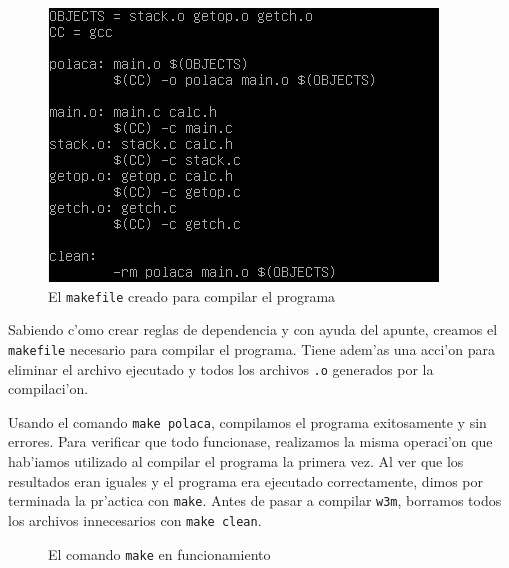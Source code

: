 \documentclass[11pt]{article}
\begin{document}
		\begin{figure}[H]
			\centering
			\includegraphics[width=.9\linewidth]{Images/Seccion 2/S2 parte tres.PNG}
			\caption{El \texttt{makefile} creado para compilar el programa}
			\label{fig:makefile}
		\end{figure}
		
		Sabiendo c'omo crear reglas de dependencia y con ayuda del apunte, creamos el \texttt{makefile} necesario para compilar el programa. Tiene adem'as una acci'on para eliminar el archivo ejecutado y todos los archivos \texttt{.o} generados por la compilaci'on.
		
		Usando el comando \texttt{make polaca}, compilamos el programa exitosamente y sin errores. Para verificar que todo funcionase, realizamos la misma operaci'on que hab'iamos utilizado al compilar el programa la primera vez. Al ver que los resultados eran iguales y el programa era ejecutado correctamente, dimos por terminada la pr'actica con \texttt{make}. Antes de pasar a compilar \texttt{w3m}, borramos todos los archivos innecesarios con \texttt{make clean}.
		
		\begin{figure}[H]
			\centering
			 \par
			
			\caption{El comando \texttt{make} en funcionamiento}
			\label{fig:makefile-successful-compile}
		\end{figure}
		
\end{document}

